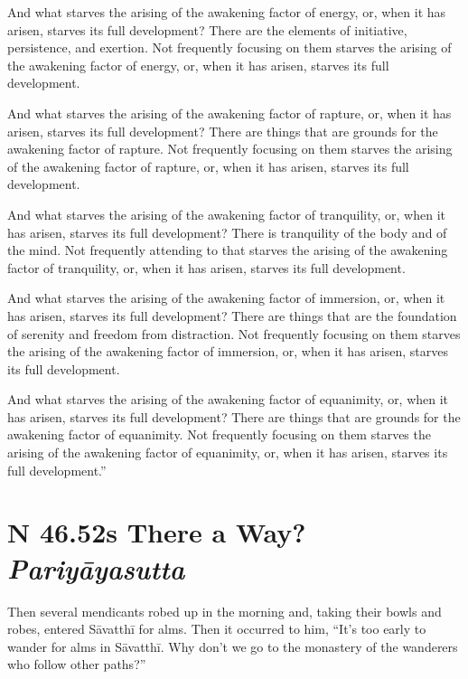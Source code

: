 \documentclass[12pt,openany]{book}%
\newcommand*{\suttatitleacronym}[1]{\smaller[2]{#1}\vspace*{.3em}}
\newcommand*{\suttatitletranslation}[1]{\linebreak{#1}}
\newcommand*{\suttatitleroot}[1]{\linebreak\smaller[2]\itshape{#1}}
\newcommand*{\tocacronym}[1]{\hspace*{-3.3em}{#1}\quad}
\newcommand*{\toctranslation}[1]{#1}
\newcommand*{\tocroot}[1]{(\textit{#1})}
\begin{document}
And what starves the arising of the awakening factor of energy, or, when it has arisen, starves its full development? There are the elements of initiative, persistence, and exertion. Not frequently focusing on them starves the arising of the awakening factor of energy, or, when it has arisen, starves its full development. 

And what starves the arising of the awakening factor of rapture, or, when it has arisen, starves its full development? There are things that are grounds for the awakening factor of rapture. Not frequently focusing on them starves the arising of the awakening factor of rapture, or, when it has arisen, starves its full development. 

And what starves the arising of the awakening factor of tranquility, or, when it has arisen, starves its full development? There is tranquility of the body and of the mind. Not frequently attending to that starves the arising of the awakening factor of tranquility, or, when it has arisen, starves its full development. 

And what starves the arising of the awakening factor of immersion, or, when it has arisen, starves its full development? There are things that are the foundation of serenity and freedom from distraction. Not frequently focusing on them starves the arising of the awakening factor of immersion, or, when it has arisen, starves its full development. 

And what starves the arising of the awakening factor of equanimity, or, when it has arisen, starves its full development? There are things that are grounds for the awakening factor of equanimity. Not frequently focusing on them starves the arising of the awakening factor of equanimity, or, when it has arisen, starves its full development.” 

%
\section*{{\suttatitleacronym SN 46.52}{\suttatitletranslation Is There a Way? }{\suttatitleroot Pariyāyasutta}}
\addcontentsline{toc}{section}{\tocacronym{SN 46.52} \toctranslation{Is There a Way? } \tocroot{Pariyāyasutta}}

Then several mendicants robed up in the morning and, taking their bowls and robes, entered \textsanskrit{Sāvatthī} for alms. Then it occurred to him, “It’s too early to wander for alms in \textsanskrit{Sāvatthī}. Why don’t we go to the monastery of the wanderers who follow other paths?” 
\end{document}
